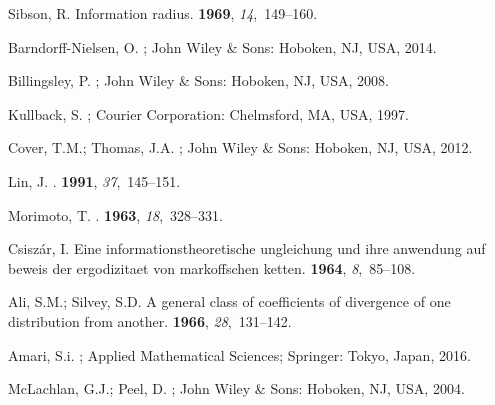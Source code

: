 \documentclass[entropy,article,accept,oneauthor,pdftex,entropy]{Definitions/mdpi}
\begin{document}
\begin{thebibliography}{999}
\providecommand{\natexlab}[1]{#1}

Sibson, R.
\newblock Information radius.
 {\bf 1969}, {\em 14},~149--160.

Barndorff-Nielsen, O.
;
  John Wiley \& Sons:  {Hoboken, NJ, USA,}  
  2014.

Billingsley, P.
; John Wiley \& Sons:  {Hoboken, NJ, USA,}  2008.


Kullback, S.
; Courier Corporation: {Chelmsford, MA, USA},  1997.

Cover, T.M.; Thomas, J.A.
; John Wiley \& Sons:  {Hoboken, NJ, USA,}  2012.


Lin, J.
.
 {\bf 1991}, {\em
  37},~145--151.

Morimoto, T.
.
 {\bf 1963}, {\em
  18},~328--331.

Csisz{\'a}r, I.
\newblock Eine informationstheoretische ungleichung und ihre anwendung auf
  beweis der ergodizitaet von markoffschen ketten.
 {\bf 1964}, {\em
  8},~85--108.

Ali, S.M.; Silvey, S.D.
\newblock A general class of coefficients of divergence of one distribution
  from another.
 {\bf 1966}, {\em 28},~131--142.

Amari, S.i.
; Applied Mathematical
  Sciences; Springer: Tokyo, Japan,  2016.

McLachlan, G.J.; Peel, D.
; John Wiley \& Sons: {Hoboken, NJ, USA,}  2004.


\end{thebibliography}
\end{document}
